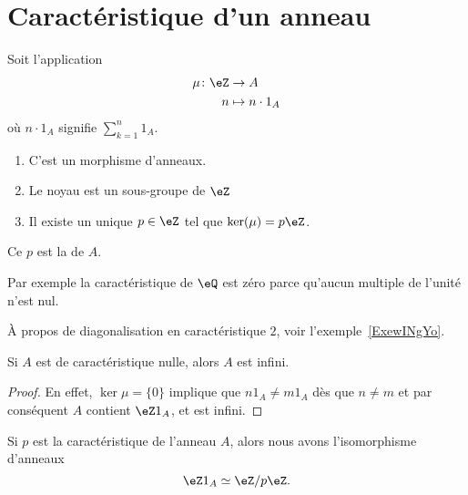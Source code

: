 \section{Caractéristique d'un anneau}

\begin{lemmaDef}        \label{LEMDEFooVEWZooUrPaDw}
    Soit l'application
    \begin{equation}
        \begin{aligned}
            \mu\colon \eZ&\to A \\
            n&\mapsto n\cdot 1_A
        \end{aligned}
    \end{equation}
    où \( n\cdot 1_A\) signifie \( \sum_{k=1}^n1_A\).
    \begin{enumerate}
        \item
            C'est un morphisme d'anneaux.
        \item
            Le noyau est un sous-groupe de \( \eZ\)
        \item
            Il existe un unique \( p\in \eZ\) tel que \( \ker(\mu)=p\eZ\).
    \end{enumerate}
    Ce \( p\) est la  de \( A\).
\end{lemmaDef}

Par exemple la caractéristique de \( \eQ\) est zéro parce qu'aucun multiple de l'unité n'est nul.

À propos de diagonalisation en caractéristique \( 2\), voir l'exemple~\ref{ExewINgYo}.

\begin{lemma}
    Si \( A\) est de caractéristique nulle, alors \( A\) est infini.
\end{lemma}

\begin{proof}
    En effet, \( \ker\mu=\{0\} \) implique que \( n1_A \neq  m1_A\) dès que \(n \neq m \) et par conséquent \( A\) contient \(\eZ 1_A \), et  est infini.
\end{proof}

\begin{lemma}       \label{LemHmDaYH}
    Si \( p\) est la caractéristique de l'anneau \( A\), alors nous avons l'isomorphisme d'anneaux
    \begin{equation}
         \eZ 1_A\simeq\eZ/p\eZ.
    \end{equation}
\end{lemma}

